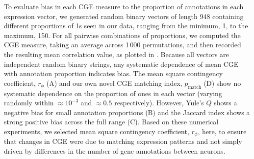 \documentclass[10pt,letterpaper]{article}
\begin{document}
{To evaluate bias in each CGE measure to the proportion of annotations in each expression vector, we generated random binary vectors of length 948 containing different proportions of 1s seen in our data, ranging from the minimum, 1, to the maximum, 150.
For all pairwise combinations of proportions, we computed the CGE measure, taking an average across 1\,000 permutations, and then recorded the resulting mean correlation value, as plotted in .
Because all vectors are independent random binary strings, any systematic dependence of mean CGE with annotation proportion indicates bias.
The mean square contingency coefficient, $r_\phi$ (A) and our own novel CGE matching index, $p_\mathrm{match}$ (D) show no systematic dependence on the proportion of ones in each vector (varying randomly within $\approx 10^{-3}$ and $\approx 0.5$ respectively).
However, Yule's $Q$ shows a negative bias for small annotation proportions (B) and the Jaccard index shows a strong positive bias across the full range (C).
Based on these numerical experiments, we selected mean square contingency coefficient, $r_\phi$, here, to ensure that changes in CGE were due to matching expression patterns and not simply driven by differences in the number of gene annotations between neurons.


}
\end{document}
